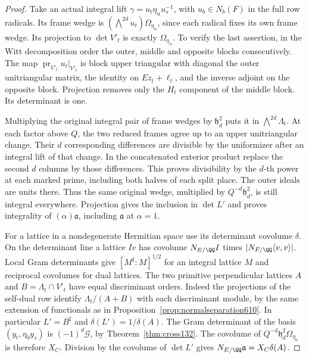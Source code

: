 \documentclass[a4paper,11pt]{article}
\theoremstyle{definition}
\theoremstyle{remark}
\numberwithin{equation}{section}
\begin{document}
\begin{proof}
Take an actual integral lift \(\gamma=u_t\eta_\alpha u_s^{-1}\),
with \(u_b\in N_b(F)\) in the full row radicals. Its frame wedge
is \((\bigwedge^{2d}u_t)\Omega_{\eta_\alpha}\), since each radical
fixes its own frame wedge. Its projection to \(\det V'_t\) is
exactly \(\Omega_{\eta_\alpha}\). To verify the last assertion,
in the Witt decomposition order the outer, middle and opposite
blocks consecutively. The map \(\operatorname{pr}_{V'_t}u_t|_{V'_t}\)
is block upper triangular with diagonal the outer unitriangular
matrix, the identity on \(E z_t+\ell_t\), and the inverse adjoint
on the opposite block. Projection removes only the \(H_t\)
component of the middle block. Its determinant is one.

Multiplying the original integral pair of frame wedges by
\(\mathfrak h_d^2\) puts it in \(\bigwedge^{2d}\Lambda_t\).
At each factor above \(Q\), the two reduced frames agree up to an
upper unitriangular change. Their \(d\) corresponding differences
are divisible by the uniformizer after an integral lift of that
change. In the concatenated exterior product replace the second
\(d\) columns by those differences. This proves divisibility by
the \(d\)-th power at each marked prime, including both halves
of each split place. The outer ideals are units there. Thus
the same original wedge, multiplied by \(Q^{-d}\mathfrak h_d^2\),
is still integral everywhere. Projection gives the inclusion in
\(\det L'\) and proves integrality of \((\alpha)\mathfrak a\),
including \(\mathfrak a\) at \(\alpha=1\).

For a lattice in a nondegenerate Hermitian space use its
determinant covolume \(\delta\). On the determinant line a
lattice \(Iv\) has covolume \(N_{E/\QQ}I\) times
\(|N_{F/\QQ}\langle v,v\rangle|\). Local Gram determinants
give \([M^\sharp:M]^{1/2}\) for an integral lattice \(M\)
and reciprocal covolumes for dual lattices. The two primitive
perpendicular lattices \(A\) and \(B=\Lambda_t\cap V'_t\)
have equal discriminant orders. Indeed the projections of the
self-dual row identify \(\Lambda_t/(A+B)\) with each discriminant
module, by the same extension of functionals as in
Proposition~\ref{prop:normalseparation610}. In particular
\(L'=B^\sharp\) and \(\delta(L')=1/\delta(A)\).
The Gram determinant of the basis \((y_t,\eta_0y_s)\) is
\((-1)^d\mathcal G\), by Theorem~\ref{thm:cross132}.
The covolume of \(Q^{-d}\mathfrak h_d^2\Omega_{\eta_0}\)
is therefore \(X_C\). Division by the covolume of \(\det L'\)
gives \(N_{E/\QQ}\mathfrak a=X_C\delta(A)\).


\end{proof}
\end{document}
